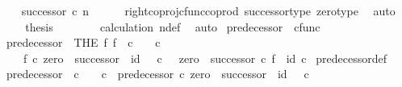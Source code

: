 \begin{isabellebody}
\ \isamarkupfalse%
\ {\isachardoublequoteopen}{\isachardot}{\kern0pt}{\isachardot}{\kern0pt}{\isachardot}{\kern0pt}\ {\isacharequal}{\kern0pt}\ successor\ {\isasymcirc}\isactrlsub c\ n{\isachardoublequoteclose}\isanewline
\ \ \ \ \isamarkupfalse%
\ right{\isacharunderscore}{\kern0pt}coproj{\isacharunderscore}{\kern0pt}cfunc{\isacharunderscore}{\kern0pt}coprod\ successor{\isacharunderscore}{\kern0pt}type\ zero{\isacharunderscore}{\kern0pt}type\ \isamarkupfalse%
\ auto\isanewline
\ \ \isamarkupfalse%
\ \isamarkupfalse%
\ {\isacharquery}{\kern0pt}thesis\isanewline
\ \ \ \ \isamarkupfalse%
\ \ \ calculation\ n{\isacharunderscore}{\kern0pt}def\ \isamarkupfalse%
\ auto\isanewline
{}\isamarkupfalse%
%
\endisatagproof
{\isafoldproof}%
%
\isadelimproof
%
\endisadelimproof
%
\isadelimdocument
%
\endisadelimdocument
%
\isatagdocument
%
\isamarkuptrue%
%
\endisatagdocument
{\isafolddocument}%
%
\isadelimdocument
%
\endisadelimdocument
{}\isamarkupfalse%
\ predecessor{\isacharprime}{\kern0pt}\ {\isacharcolon}{\kern0pt}{\isacharcolon}{\kern0pt}\ {\isachardoublequoteopen}cfunc{\isachardoublequoteclose}\ \isanewline
\ \ {\isachardoublequoteopen}predecessor{\isacharprime}{\kern0pt}\ {\isacharequal}{\kern0pt}\ {\isacharparenleft}{\kern0pt}THE\ f{\isachardot}{\kern0pt}\ f\ {\isacharcolon}{\kern0pt}\ {\isasymnat}\isactrlsub c\ {\isasymrightarrow}\ {\isasymone}\ {\isasymCoprod}\ {\isasymnat}\isactrlsub c\ \isanewline
\ \ \ \ {\isasymand}\ f\ {\isasymcirc}\isactrlsub c\ {\isacharparenleft}{\kern0pt}zero\ {\isasymamalg}\ successor{\isacharparenright}{\kern0pt}\ {\isacharequal}{\kern0pt}\ id\ {\isacharparenleft}{\kern0pt}{\isasymone}\ {\isasymCoprod}\ {\isasymnat}\isactrlsub c{\isacharparenright}{\kern0pt}\ {\isasymand}\ \ {\isacharparenleft}{\kern0pt}zero\ {\isasymamalg}\ successor{\isacharparenright}{\kern0pt}\ {\isasymcirc}\isactrlsub c\ f\ {\isacharequal}{\kern0pt}\ id\ {\isasymnat}\isactrlsub c{\isacharparenright}{\kern0pt}{\isachardoublequoteclose}\isanewline
\isanewline
{}\isamarkupfalse%
\ predecessor{\isacharprime}{\kern0pt}{\isacharunderscore}{\kern0pt}def{}{\isacharcolon}{\kern0pt}\isanewline
\ \ {\isachardoublequoteopen}predecessor{\isacharprime}{\kern0pt}\ {\isacharcolon}{\kern0pt}\ {\isasymnat}\isactrlsub c\ {\isasymrightarrow}\ {\isasymone}\ {\isasymCoprod}\ {\isasymnat}\isactrlsub c\ {\isasymand}\ predecessor{\isacharprime}{\kern0pt}\ {\isasymcirc}\isactrlsub c\ {\isacharparenleft}{\kern0pt}zero\ {\isasymamalg}\ successor{\isacharparenright}{\kern0pt}\ {\isacharequal}{\kern0pt}\ id\ {\isacharparenleft}{\kern0pt}{\isasymone}\ {\isasymCoprod}\ {\isasymnat}\isactrlsub c{\isacharparenright}{\kern0pt}\isanewline

\end{isabellebody}
